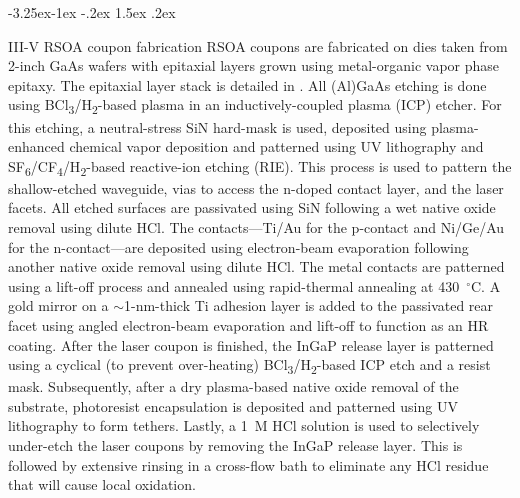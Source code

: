\documentclass[%
 reprint,
 amsmath,amssymb,
 aps,
]{revtex4-2}
\makeatletter
\renewcommand\subsection{\@startsection {subsection}{2}{0pt}%
  {-3.25ex\@plus -1ex \@minus -.2ex}%
  {1.5ex \@plus .2ex}%
  {\normalfont\normalsize\bfseries\raggedright}}
\makeatother
\begin{document}
\subsection{III-V RSOA coupon fabrication}
RSOA coupons are fabricated on dies taken from 2-inch GaAs wafers with epitaxial layers grown using metal-organic vapor phase epitaxy. The epitaxial layer stack is detailed in \cite{kiewiet2026micro}. All (Al)GaAs etching is done using BCl\textsubscript{3}/H\textsubscript{2}-based plasma in an inductively-coupled plasma (ICP) etcher. For this etching, a neutral-stress SiN hard-mask is used, deposited using plasma-enhanced chemical vapor deposition and patterned using UV lithography and SF\textsubscript{6}/CF\textsubscript{4}/H\textsubscript{2}-based reactive-ion etching (RIE). This process is used to pattern the shallow-etched waveguide, vias to access the n-doped contact layer, and the laser facets. All etched surfaces are passivated using SiN following a wet native oxide removal using dilute HCl. The contacts---Ti/Au for the p-contact and Ni/Ge/Au for the n-contact---are deposited using electron-beam evaporation following another native oxide removal using dilute HCl. The metal contacts are patterned using a lift-off process and annealed using rapid-thermal annealing at 430~$^{\circ}$C. A gold mirror on a $\sim$1-nm-thick Ti adhesion layer is added to the passivated rear facet using angled electron-beam evaporation and lift-off to function as an HR coating. After the laser coupon is finished, the InGaP release layer is patterned using a cyclical (to prevent over-heating) BCl\textsubscript{3}/H\textsubscript{2}-based ICP etch and a resist mask. Subsequently, after a dry plasma-based native oxide removal of the substrate, photoresist encapsulation is deposited and patterned using UV lithography to form tethers. Lastly, a 1~M HCl solution is used to selectively under-etch the laser coupons by removing the InGaP release layer. This is followed by extensive rinsing in a cross-flow bath to eliminate any HCl residue that will cause local oxidation.
\end{document}
